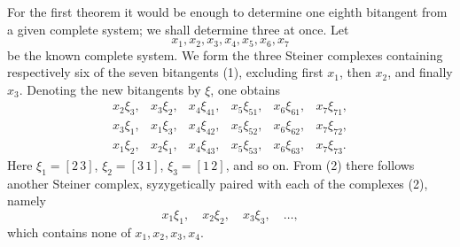 \documentclass[11pt]{article}
\providecommand{\pair}[2]{[#1\,#2]}
\begin{document}
For the first theorem it would be enough to determine one eighth bitangent from a given complete system; we shall determine three at once. Let
\begin{equation}
 x_1,x_2,x_3,x_4,x_5,x_6,x_7
 \tag{1}
\end{equation}
be the known complete system. We form the three Steiner complexes containing respectively six of the seven bitangents (1), excluding first \(x_1\), then \(x_2\), and finally \(x_3\). Denoting the new bitangents by \(\xi\), one obtains
\begin{equation}
\begin{array}{llllll}
 x_2\xi_3,&x_3\xi_2,&x_4\xi_{41},&x_5\xi_{51},&x_6\xi_{61},&x_7\xi_{71},\\
 x_3\xi_1,&x_1\xi_3,&x_4\xi_{42},&x_5\xi_{52},&x_6\xi_{62},&x_7\xi_{72},\\
 x_1\xi_2,&x_2\xi_1,&x_4\xi_{43},&x_5\xi_{53},&x_6\xi_{63},&x_7\xi_{73}.
\end{array}
\tag{2}
\end{equation}
Here \(\xi_1=\pair{2}{3}\), \(\xi_2=\pair{3}{1}\), \(\xi_3=\pair{1}{2}\), and so on. From (2) there follows another Steiner complex, syzygetically paired with each of the complexes (2), namely
\begin{equation}
 x_1\xi_1,\quad x_2\xi_2,\quad x_3\xi_3,\quad \ldots,
 \tag{3}
\end{equation}
which contains none of \(x_1,x_2,x_3,x_4\).
\end{document}
